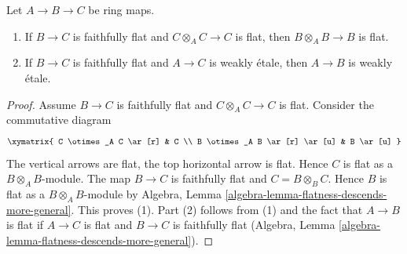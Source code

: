 \begin{lemma}
\label{lemma-go-down}
Let $A \to B \to C$ be ring maps.
\begin{enumerate}
\item If $B \to C$ is faithfully flat and $C \otimes_A C \to C$ is flat,
then $B \otimes_A B \to B$ is flat.
\item If $B \to C$ is faithfully flat and $A \to C$ is weakly \'etale,
then $A \to B$ is weakly \'etale.
\end{enumerate}
\end{lemma}

\begin{proof}
Assume $B \to C$ is faithfully flat and $C \otimes_A C \to C$ is flat.
Consider the commutative diagram
$$
\xymatrix{
C \otimes_A C \ar[r] & C \\
B \otimes_A B \ar[r] \ar[u] & B \ar[u]
}
$$
The vertical arrows are flat, the top horizontal arrow is flat.
Hence $C$ is flat as a $B \otimes_A B$-module. The map $B \to C$ is
faithfully flat and $C = B \otimes_B C$. Hence $B$ is flat as a
$B \otimes_A B$-module by
Algebra, Lemma \ref{algebra-lemma-flatness-descends-more-general}.
This proves (1). Part (2) follows from (1) and the fact that
$A \to B$ is flat if $A \to C$ is flat and $B \to C$ is faithfully flat
(Algebra, Lemma \ref{algebra-lemma-flatness-descends-more-general}).
\end{proof}

